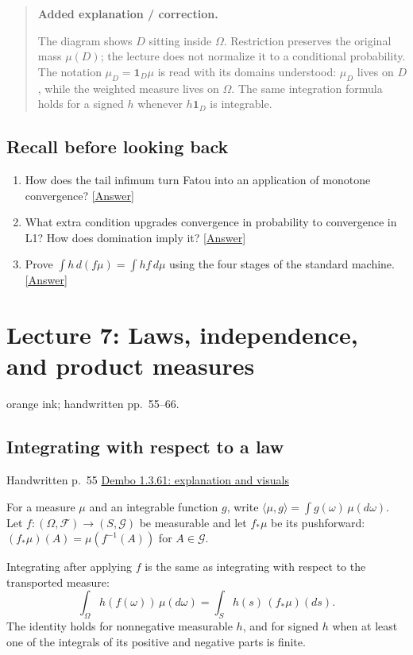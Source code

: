 \documentclass[11pt,letterpaper]{article}
\newcommand{\lecturesection}[1]{\subsection{#1}}
\begin{document}
\begin{quote}\small\textbf{Added explanation / correction.}

The diagram shows $D$ sitting inside $\Omega$. Restriction preserves the original mass $\mu(D)$; the lecture does not normalize it to a conditional probability. The notation $\mu_D=\mathbf1_D\mu$ is read with its domains understood: $\mu_D$ lives on $D$, while the weighted measure lives on $\Omega$. The same integration formula holds for a signed $h$ whenever $h\mathbf1_D$ is integrable.
\end{quote}

\subsection*{Recall before looking back}
\begin{enumerate}
\item How does the tail infimum turn Fatou into an application of monotone convergence? \hyperlink{answer-l6-s2}{[Answer]}
\item What extra condition upgrades convergence in probability to convergence in L1? How does domination imply it? \hyperlink{answer-l6-s4}{[Answer]}
\item Prove $\int h\,d(f\mu)=\int hf\,d\mu$ using the four stages of the standard machine. \hyperlink{answer-l6-s7}{[Answer]}
\end{enumerate}

\clearpage
{}
\section{Lecture 7: Laws, independence, and product measures}
{\small orange ink; handwritten pp.\ 55--66.}

\hypertarget{l7-s1}{}
\lecturesection{Integrating with respect to a law}
{\small\textcolor{lectureink}{Handwritten p.\ 55} \quad \href{https://josephrbailey.com/probability/\#entry-1-3-61}{Dembo 1.3.61: explanation and visuals}}

For a measure $\mu$ and an integrable function $g$, write $\langle\mu,g\rangle=\int g(\omega)\,\mu(d\omega)$. Let $f:(\Omega,\mathcal F)\to(S,\mathcal G)$ be measurable and let $f_*\mu$ be its pushforward: $(f_*\mu)(A)=\mu(f^{-1}(A))$ for $A\in\mathcal G$.

Integrating after applying $f$ is the same as integrating with respect to the transported measure: \[\int_\Omega h(f(\omega))\,\mu(d\omega)=\int_S h(s)\,(f_*\mu)(ds).\] The identity holds for nonnegative measurable $h$, and for signed $h$ when at least one of the integrals of its positive and negative parts is finite.
\end{document}
